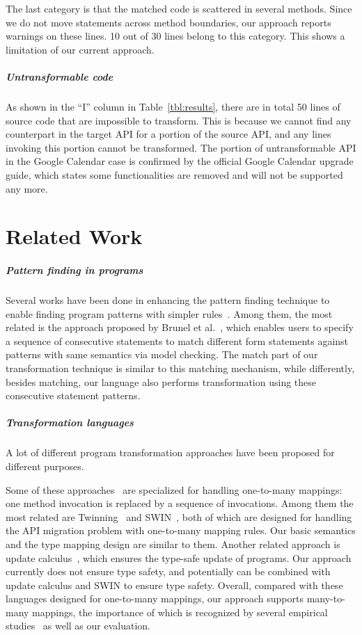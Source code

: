\documentclass[letterpaper, USenglish]{lipics-v2016}
\theoremstyle{plain}
\begin{document}
The last category is that the
matched code is scattered in several methods. Since we do not
move statements across method boundaries, our approach reports
warnings on these lines. 10 out of 30 lines
belong to this category. This shows a limitation of our current
approach.

\subparagraph*{Untransformable code}
As shown in the ``I'' column in
Table~\ref{tbl:results}, there are in total 50 lines of source code
that are impossible to transform. This is because we cannot find any
counterpart in the target API for a portion of the source API, and any
lines invoking this portion cannot be transformed. The portion of
untransformable API in the Google Calendar case is confirmed by the
official Google Calendar upgrade guide, which states some
functionalities are removed and will not be supported any more. 



\section{Related Work}
\label{sec:related}
\subparagraph*{Pattern finding in programs} Several works have been
done in enhancing the pattern finding technique to enable finding
program patterns with simpler
rules~\cite{SANER-2015-PalixFL,DBLP:conf/popl/BrunelDHLM09}.
Among them, the most related is the approach proposed by
Brunel et al.~\cite{DBLP:conf/popl/BrunelDHLM09}, which enables users to
specify a sequence of consecutive statements to match different form
statements against patterns with same semantics via model
checking. The match part of our transformation technique is similar to
this matching mechanism, while differently, besides matching, our language also performs transformation using these consecutive statement patterns.
\subparagraph*{Transformation languages} A lot of different program
transformation approaches have been proposed for different purposes.

Some of these approaches~\cite{Nita:2010:UTA:1806799.1806832,Li:2015:STT:2678015.2682534,Balaban:2005:RSC:1094811.1094832,Wasserman:2013:SER:2541348.2541355,53e99905b7602d9702142000,53e99aecb7602d9702376989} are specialized for handling one-to-many mappings: one method invocation is replaced by a sequence of invocations. 
Among them the most related are
Twinning~\cite{Nita:2010:UTA:1806799.1806832} and
SWIN~\cite{Li:2015:STT:2678015.2682534}, both of which are designed
for handling the API migration problem with one-to-many mapping rules. Our basic
semantics and the type mapping design are similar to them. Another related approach is update
calculus~\cite{53e99905b7602d9702142000,53e99aecb7602d9702376989},
which ensures the type-safe update of programs. Our approach
currently does not ensure type safety, and potentially can be combined
with update calculus and SWIN to ensure type safety.
Overall, compared with these languages designed for one-to-many mappings, our approach supports many-to-many mappings, the importance of which is recognized by several empirical studies~\cite{Bartolomei:2009:SAM:2127907.2127914,246} as well as our evaluation.
\end{document}

